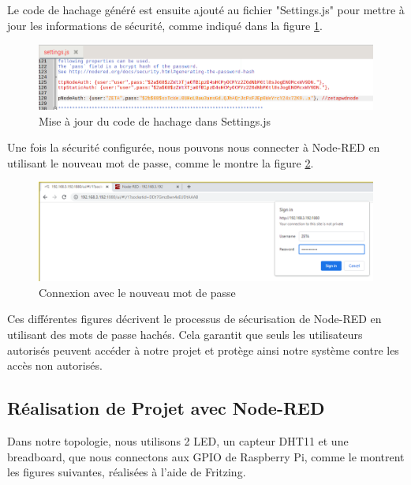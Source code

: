 Le code de hachage généré est ensuite ajouté au fichier "Settings.js" pour mettre à jour les informations de sécurité, comme indiqué dans la figure \ref{Chap4.3.11}.

\begin{figure}[H]
\centering
\includegraphics[width=15cm]{Images/Node-4.png}
\caption{Mise à jour du code de hachage dans Settings.js}
\label{Chap4.3.11}
\end{figure}

Une fois la sécurité configurée, nous pouvons nous connecter à Node-RED en utilisant le nouveau mot de passe, comme le montre la figure \ref{Chap4.3.12}.

\begin{figure}[H]
\centering
\includegraphics[width=15cm]{Images/Node-5.png}
\caption{Connexion avec le nouveau mot de passe}
\label{Chap4.3.12}
\end{figure}

Ces différentes figures décrivent le processus de sécurisation de Node-RED en utilisant des mots de passe hachés. Cela garantit que seuls les utilisateurs autorisés peuvent accéder à notre projet et protège ainsi notre système contre les accès non autorisés.

\subsection{Réalisation de Projet avec Node-RED}

Dans notre topologie, nous utilisons 2 LED, un capteur DHT11 et une breadboard, que nous connectons aux GPIO de Raspberry Pi, comme le montrent les figures suivantes, réalisées à l'aide de Fritzing.

